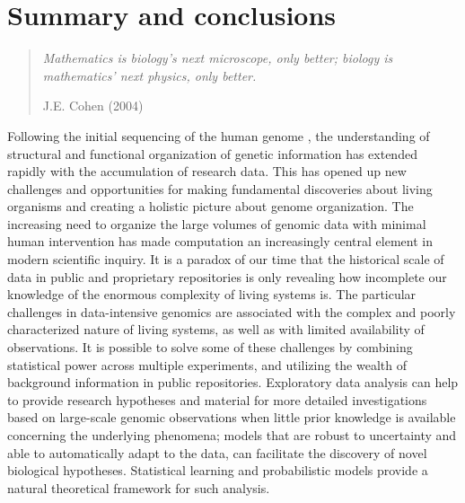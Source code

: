 \chapter{Summary and conclusions}
\label{ch:conclusion}

\begin{quotation}
  \emph{Mathematics is biology's next microscope, only better; biology
    is mathematics' next physics, only better.}
\begin{flushright}
J.E. Cohen (2004)
\end{flushright}
\end{quotation}

Following the initial sequencing of the human genome \citep{Lander01,
  Venter01}, the understanding of structural and functional
organization of genetic information has extended rapidly with the
accumulation of research data. This has opened up new challenges and
opportunities for making fundamental discoveries about living
organisms and creating a holistic picture about genome
organization. The increasing need to organize the large volumes of
genomic data with minimal human intervention has made computation an
increasingly central element in modern scientific inquiry. It is a
paradox of our time that the historical scale of data in public and
proprietary repositories is only revealing how incomplete our
knowledge of the enormous complexity of living systems is. The
particular challenges in data-intensive genomics are associated with
the complex and poorly characterized nature of living systems, as well
as with limited availability of observations.  It is possible to solve
some of these challenges by combining statistical power across
multiple experiments, and utilizing the wealth of background
information in public repositories. Exploratory data analysis can help
to provide research hypotheses and material for more detailed
investigations based on large-scale genomic observations when little
prior knowledge is available concerning the underlying phenomena;
models that are robust to uncertainty and able to automatically adapt
to the data, can facilitate the discovery of novel biological
hypotheses. Statistical learning and probabilistic models provide a
natural theoretical framework for such analysis.

